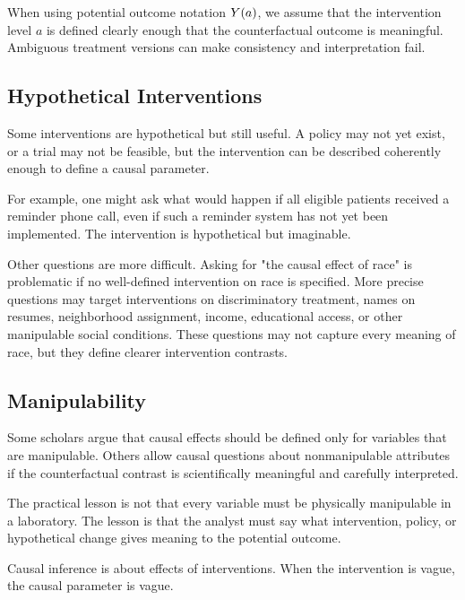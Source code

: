 \begin{assumptionbox}
When using potential outcome notation $Y(a)$, we assume that the intervention level $a$ is defined clearly enough that the counterfactual outcome is meaningful. Ambiguous treatment versions can make consistency and interpretation fail.
\end{assumptionbox}

\subsection{Hypothetical Interventions}

Some interventions are hypothetical but still useful. A policy may not yet exist, or a trial may not be feasible, but the intervention can be described coherently enough to define a causal parameter.

For example, one might ask what would happen if all eligible patients received a reminder phone call, even if such a reminder system has not yet been implemented. The intervention is hypothetical but imaginable.

Other questions are more difficult. Asking for "the causal effect of race" is problematic if no well-defined intervention on race is specified. More precise questions may target interventions on discriminatory treatment, names on resumes, neighborhood assignment, income, educational access, or other manipulable social conditions. These questions may not capture every meaning of race, but they define clearer intervention contrasts.

\subsection{Manipulability}

Some scholars argue that causal effects should be defined only for variables that are manipulable. Others allow causal questions about nonmanipulable attributes if the counterfactual contrast is scientifically meaningful and carefully interpreted.

The practical lesson is not that every variable must be physically manipulable in a laboratory. The lesson is that the analyst must say what intervention, policy, or hypothetical change gives meaning to the potential outcome.

\begin{keyidea}
Causal inference is about effects of interventions. When the intervention is vague, the causal parameter is vague.
\end{keyidea}

